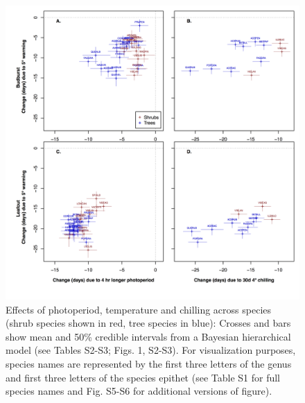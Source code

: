 \documentclass[11pt]{article}
\begin{document}
\newpage
\begin{figure}[h!]
\centering
\noindent \includegraphics[width=1\textwidth]{images/Fig2_4panel.png}
\caption{Effects of photoperiod, temperature and chilling across species (shrub species shown in red, tree species in blue): Crosses and bars show mean and 50\% credible intervals from a Bayesian hierarchical model (see Tables S2-S3; Figs. 1, S2-S3). For visualization purposes, species names are represented by the first three letters of the genus and first three letters of the species epithet (see Table S1 for full species names and Fig. S5-S6 for additional versions of figure).}
\label{fig:sppeff}
\end{figure}
\end{document}
